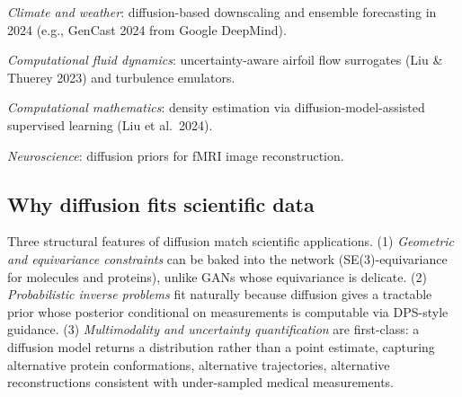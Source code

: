 \emph{Climate and weather}: diffusion-based downscaling and ensemble forecasting in 2024 (e.g., GenCast 2024 from Google DeepMind).

\emph{Computational fluid dynamics}: uncertainty-aware airfoil flow surrogates (Liu \& Thuerey 2023) and turbulence emulators.

\emph{Computational mathematics}: density estimation via diffusion-model-assisted supervised learning (Liu et al.~2024).

\emph{Neuroscience}: diffusion priors for fMRI image reconstruction.

\subsection{Why diffusion fits scientific data}\label{why-diffusion-fits-scientific-data}

Three structural features of diffusion match scientific applications. (1) \emph{Geometric and equivariance constraints} can be baked into the network (SE(3)-equivariance for molecules and proteins), unlike GANs whose equivariance is delicate. (2) \emph{Probabilistic inverse problems} fit naturally because diffusion gives a tractable prior whose posterior conditional on measurements is computable via DPS-style guidance. (3) \emph{Multimodality and uncertainty quantification} are first-class: a diffusion model returns a distribution rather than a point estimate, capturing alternative protein conformations, alternative trajectories, alternative reconstructions consistent with under-sampled medical measurements.

